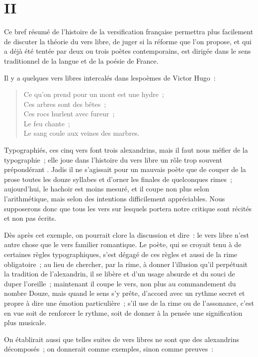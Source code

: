 \documentclass[french,twoside]{book} %
\newcommand{\bibl}[1]{{\RaggedLeft{#1}\par\bigskip}}
\newenvironment{quoteblock}%
  {\begin{quoting}}
  {\end{quoting}}
\newenvironment{quotebar}{%
    \def\FrameCommand{{\color{rubric!10!}\vrule width 0.5em} \hspace{0.9em}}%
    \def\OuterFrameSep{\itemsep} %
    \MakeFramed {\advance\hsize-\width \FrameRestore}
  }%
  {%
    \endMakeFramed
  }
\renewenvironment{quoteblock}%
  {%
    \savenotes
    \setstretch{0.9}
    \normalfont
    \begin{quotebar}
  }
  {%
    \end{quotebar}
    \spewnotes
  }
\begin{document}
\section[{II}]{II}
\noindent Ce bref résumé de l’histoire de la versification française permettra plus facilement de discuter la théorie du vers libre, de juger si la réforme que l’on propose, et qui a déjà été tentée par deux ou trois poètes contemporains, est dirigée dans le sens traditionnel de la langue et de la poésie de France.\par
Il y a quelques vers libres intercalés dans lespoèmes de Victor Hugo :\par


\begin{verse}
Ce qu’on prend pour un mont est une hydre ;\\
Ces arbres sont des bêtes ;\\
Ces rocs hurlent avec fureur ;\\
Le feu chante ;\\
Le sang coule aux veines des marbres.\\
\end{verse}
\begin{quoteblock}

\bibl{(Les {\itshape Contemplations.})}
\end{quoteblock}

\noindent Typographiés, ces cinq vers font trois alexandrins, mais il faut nous méfier de la typographie ; elle joue dans l’histoire du vers libre un rôle trop souvent prépondérant . Jadis il ne s’agissait pour un mauvais poète que de couper de la prose toutes les douze syllabes et d’orner les finales de quelconques rimes ; aujourd’hui, le hachoir est moins mesuré, et il coupe non plus selon l’arithmétique, mais selon des intentions difficilement appréciables. Nous supposerons donc que tous les vers sur lesquels portera notre critique sont récités et non pas écrits.\par
Dès après cet exemple, on pourrait clore la discussion et dire : le vers libre n’est autre chose que le vers familier romantique. Le poète, qui se croyait tenu à de certaines règles typographiques, s’est dégagé de ces règles et aussi de la rime obligatoire ; au lieu de chercher, par la rime, à donner l’illusion qu’il perpétuait la tradition de l’alexandrin, il se libère et d’un usage absurde et du souci de duper l’oreille ; maintenant il coupe le vers, non plus au commandement du nombre Douze, mais quand le sens s’y prête, d’accord avec un rythme secret et propre à dire une émotion particulière ; s’il use de la rime ou de l’assonance, c’est en vue soit de renforcer le rythme, soit de donner à la pensée une signification plus musicale.\par
On établirait aussi que telles suites de vers libres ne sont que des alexandrins décomposés ; on donnerait comme exemples, sinon comme preuves :\par
\end{document}
